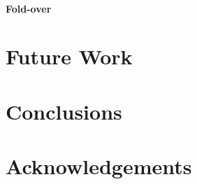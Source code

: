 \documentclass{article}
\begin{document}
\paragraph{Fold-over}

\section{Future Work}


\section{Conclusions}



\section*{Acknowledgements}




%
%
%

\end{document}
